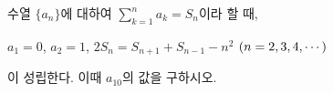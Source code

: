 수열 $\{a_n\}$에 대하여 $\displaystyle\sum_{k=1}^{n}a_k=S_n$이라 할 때, \par\smallskip\noindent\hspace*{1.5em}$a_1=0$, $a_2=1$, $2S_n=S_{n+1}+S_{n-1}-n^2$ $(n=2{,}\mkern3mu\mathopen{}3{,}\mkern3mu\mathopen{}4{,}\mkern3mu\mathopen{}\cdots)$\par\smallskip\noindent 이 성립한다. 이때 $a_{10}$의 값을 구하시오.
